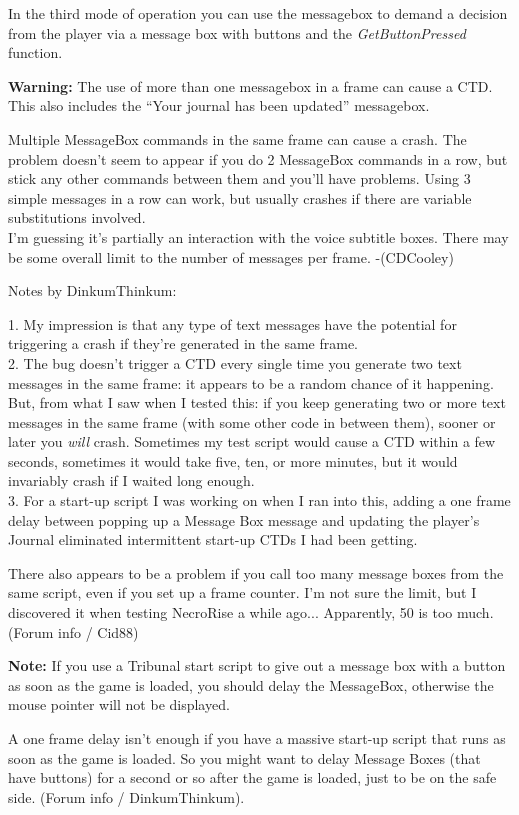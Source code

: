\documentclass[
]{article}
\begin{document}
In the third mode of operation you can use the messagebox to demand a
decision from the player via a message box with buttons and the
\emph{GetButtonPressed} function.

\textbf{Warning:} The use of more than one messagebox in a frame can
cause a CTD. This also includes the ``Your journal has been updated''
messagebox.

Multiple MessageBox commands in the same frame can cause a crash. The
problem doesn't seem to appear if you do 2 MessageBox commands in a row,
but stick any other commands between them and you'll have problems.
Using 3 simple messages in a row can work, but usually crashes if there
are variable substitutions involved.\\
I'm guessing it's partially an interaction with the voice subtitle
boxes. There may be some overall limit to the number of messages per
frame. -(CDCooley)

Notes by DinkumThinkum:

1. My impression is that any type of text messages have the potential
for triggering a crash if they're generated in the same frame.\\
2. The bug doesn't trigger a CTD every single time you generate two text
messages in the same frame: it appears to be a random chance of it
happening. But, from what I saw when I tested this: if you keep
generating two or more text messages in the same frame (with some other
code in between them), sooner or later you \emph{will} crash. Sometimes
my test script would cause a CTD within a few seconds, sometimes it
would take five, ten, or more minutes, but it would invariably crash if
I waited long enough.\\
3. For a start-up script I was working on when I ran into this, adding a
one frame delay between popping up a Message Box message and updating
the player's Journal eliminated intermittent start-up CTDs I had been
getting.

There also appears to be a problem if you call too many message boxes
from the same script, even if you set up a frame counter. I'm not sure
the limit, but I discovered it when testing NecroRise a while ago...
Apparently, 50 is too much. (Forum info / Cid88)

\textbf{Note:} If you use a Tribunal start script to give out a message
box with a button as soon as the game is loaded, you should delay the
MessageBox, otherwise the mouse pointer will not be displayed.

A one frame delay isn't enough if you have a massive start-up script
that runs as soon as the game is loaded. So you might want to delay
Message Boxes (that have buttons) for a second or so after the game is
loaded, just to be on the safe side. (Forum info / DinkumThinkum).
\end{document}
